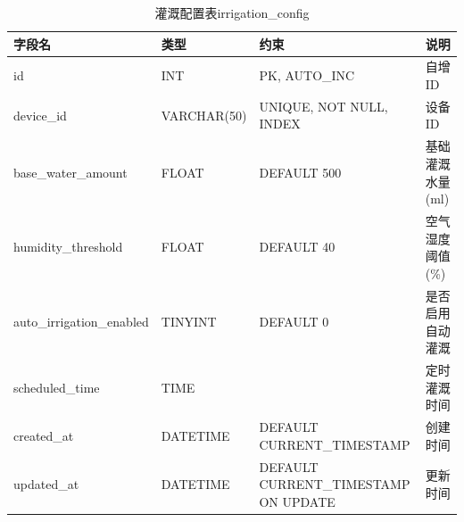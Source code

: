 \documentclass{article}
\begin{document}
\begin{table}[htbp]
  \centering
  \caption{灌溉配置表irrigation\_config}
  \label{tab:灌溉配置表}
  \begin{tabular}{|l|l|l|l|}
    \hline
    字段名                  & 类型        & 约束                                   & 说明             \\
    \hline
    id                      & INT         & PK, AUTO\_INC                          & 自增ID           \\
    device\_id               & VARCHAR(50) & UNIQUE, NOT NULL, INDEX                & 设备ID           \\
    base\_water\_amount       & FLOAT       & DEFAULT 500                            & 基础灌溉水量(ml) \\
    humidity\_threshold      & FLOAT       & DEFAULT 40                             & 空气湿度阈值(\%)  \\
    auto\_irrigation\_enabled & TINYINT     & DEFAULT 0                              & 是否启用自动灌溉 \\
    scheduled\_time          & TIME        &                                        & 定时灌溉时间     \\
    created\_at              & DATETIME    & DEFAULT CURRENT\_TIMESTAMP             & 创建时间         \\
    updated\_at              & DATETIME    & DEFAULT CURRENT\_TIMESTAMP ON UPDATE    & 更新时间         \\
    \hline
  \end{tabular}
\end{table}
\end{document}
